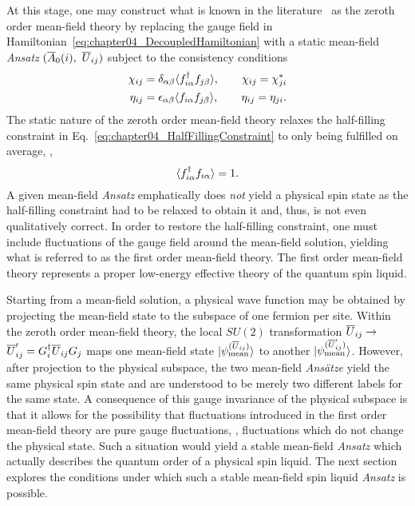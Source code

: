 At this stage, one may construct what is known in the literature~\cite{WenPRB2002} as the zeroth order mean-field theory by replacing the gauge field in Hamiltonian~\eqref{eq:chapter04_DecoupledHamiltonian} with a static mean-field \textit{Ansatz} $(\overline{A}_0(i),~\overline{U}_{ij})$ subject to the consistency conditions
%
\begin{align}
	\chi_{ij} &= \delta_{\alpha\beta} \langle f^{\dagger}_{i\alpha} f_{j\beta} \rangle, \qquad \chi_{ij} = \chi^*_{ji} \nonumber\\
	\eta_{ij} &= \epsilon_{\alpha\beta} \langle f_{i\alpha} f_{j\beta} \rangle, \qquad \eta_{ij} = \eta_{ji}.
	\label{eq:chapter04_MeanFieldCondition}
\end{align}
%
The static nature of the zeroth order mean-field theory relaxes the half-filling constraint in Eq.~\eqref{eq:chapter04_HalfFillingConstraint} to only being fulfilled on average, \ie,
%
\begin{equation}
	\langle f^{\dagger}_{i\alpha} f_{i\alpha} \rangle = 1.
\end{equation}
%
A given mean-field \textit{Ansatz} emphatically does \textit{not} yield a physical spin state as the half-filling constraint had to be relaxed to obtain it and, thus, is not even qualitatively correct.
In order to restore the half-filling constraint, one must include fluctuations of the gauge field around the mean-field solution, yielding what is referred to as the first order mean-field theory.
The first order mean-field theory represents a proper low-energy effective theory of the quantum spin liquid.

Starting from a mean-field solution, a physical wave function may be obtained by projecting the mean-field state to the subspace of one fermion per site.
Within the zeroth order mean-field theory, the local $SU(2)$ transformation $\overline{U}_{ij} \rightarrow$\linebreak $\overline{U}'_{ij} = G^{\dagger}_i \overline{U}_{ij} G_j$ maps one mean-field state $| \psi^{(\overline{U}_{ij})}_{\rm mean} \rangle$ to another $| \psi^{(\overline{U}'_{ij})}_{\rm mean} \rangle$.
However, after projection to the physical subspace, the two mean-field \textit{Ans\"atze} yield the same physical spin state and are understood to be merely two different labels for the same state.
A consequence of this gauge invariance of the physical subspace is that it allows for the possibility that fluctuations introduced in the first order mean-field theory are pure gauge fluctuations, \ie, fluctuations which do not change the physical state.
Such a situation would yield a stable mean-field \textit{Ansatz} which actually describes the quantum order of a physical spin liquid.
The next section explores the conditions under which such a stable mean-field spin liquid \textit{Ansatz} is possible.


